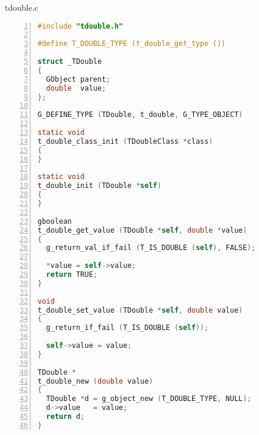 tdouble.c

\begin{lstlisting}[language=C, numbers=left]
#include "tdouble.h"

#define T_DOUBLE_TYPE (t_double_get_type ())

struct _TDouble
{
  GObject parent;
  double  value;
};

G_DEFINE_TYPE (TDouble, t_double, G_TYPE_OBJECT)

static void
t_double_class_init (TDoubleClass *class)
{
}

static void
t_double_init (TDouble *self)
{
}

gboolean
t_double_get_value (TDouble *self, double *value)
{
  g_return_val_if_fail (T_IS_DOUBLE (self), FALSE);

  *value = self->value;
  return TRUE;
}

void
t_double_set_value (TDouble *self, double value)
{
  g_return_if_fail (T_IS_DOUBLE (self));

  self->value = value;
}

TDouble *
t_double_new (double value)
{
  TDouble *d = g_object_new (T_DOUBLE_TYPE, NULL);
  d->value   = value;
  return d;
}
\end{lstlisting}


